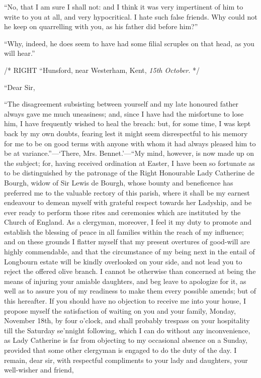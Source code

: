 \documentclass[12pt]{book}
\begin{document}
``No, that I am sure I shall not: and I think it was very impertinent of him to write to you at all, and very hypocritical. I hate such false friends. Why could not he keep on quarrelling with you, as his father did before him?''

``Why, indeed, he does seem to have had some filial scruples on that head, as you will hear.''

/* RIGHT ``Hunsford, near Westerham, Kent, \textit{15th October}. */

``Dear Sir,

``The disagreement subsisting between yourself and my late honoured father always gave me much uneasiness; and, since I have had the misfortune to lose him, I have frequently wished to heal the breach: but, for some time, I was kept back by my own doubts, fearing lest it might seem disrespectful to his memory for me to be on good terms with anyone with whom it had always pleased him to be at variance.''---`There, Mrs. Bennet.'---``My mind, however, is now made up on the subject; for, having received ordination at Easter, I have been so fortunate as to be distinguished by the patronage of the Right Honourable Lady Catherine de Bourgh, widow of Sir Lewis de Bourgh, whose bounty and beneficence has preferred me to the valuable rectory of this parish, where it shall be my earnest endeavour to demean myself with grateful respect towards her Ladyship, and be ever ready to perform those rites and ceremonies which are instituted by the Church of England. As a clergyman, moreover, I feel it my duty to promote and establish the blessing of peace in all families within the reach of my influence; and on these grounds I flatter myself that my present overtures of good-will are highly commendable, and that the circumstance of my being next in the entail of Longbourn estate will be kindly overlooked on your side, and not lead you to reject the offered olive branch. I cannot be otherwise than concerned at being the means of injuring your amiable daughters, and beg leave to apologize for it, as well as to assure you of my readiness to make them every possible amends; but of this hereafter. If you should have no objection to receive me into your house, I propose myself the satisfaction of waiting on you and your family, Monday, November 18th, by four o'clock, and shall probably trespass on your hospitality till the Saturday se'nnight following, which I can do without any inconvenience, as Lady Catherine is far from objecting to my occasional absence on a Sunday, provided that some other clergyman is engaged to do the duty of the day. I remain, dear sir, with respectful compliments to your lady and daughters, your well-wisher and friend,
\end{document}
